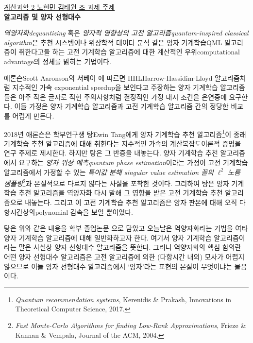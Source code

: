 \documentclass[a4paper,hidelinks]{oblivoir}
\begin{document}
\thispagestyle{empty}
\begin{center}
  \underline{계산과학 2 노현민-김태원 조 과제 주제} \\
  \textbf{ 알고리즘 및 양자 선형대수} \\ 
\end{center}
\emph{역양자화\footnotesize dequantizing} 혹은 \emph{양자적 영향상의
고전 알고리즘\footnotesize quantum-inspired classical algorithm}은 추천
시스템이나 위상학적 데이터 분석 같은 양자 기계학습{\footnotesize QML}
알고리즘이 취한다고들 하는 고전 기계학습 알고리즘에 대한 계산적인 
우위{\footnotesize computational advantage}의 정체를 밝히는 기법이다.

애론슨{\footnotesize Scott Aaronson}의 서베이 에 따르면
HHL{\footnotesize Harrow-Hassidim-Lloyd} 알고리즘처럼 지수적인 가속{\footnotesize
exponential speedup}을 보인다고 주장하는 양자 기계학습 알고리즘들은 아주
작은 글자로 적힌 주의사항처럼 결정적인 가정 내지 조건을 은연중에 요구한다.
이들 가정은 양자 기계학습 알고리즘과 고전 기계학습 알고리즘 간의 정당한
비교를 어렵게 만든다.

2018년 애론슨은 학부연구생 탕{\footnotesize Ewin Tang}에게
양자 기계학습 추천 알고리즘\footnote{\emph{Quantum recommendation systems},
  Kerenidis \& Prakash, Innovations in Theoretical Computer Science, 
2017.}이 종래 기계학습 추천 알고리즘에 대해 취한다는 지수적인 가속의
계산복잡도이론적 증명을 연구 주제로 제시한다. 하지만 탕은 그 반증을
내놓는다. 양자 기계학습 추천 알고리즘에서 요구하는 \emph{양자 위상
예측\footnotesize quantum phase estimation}이라는 가정이 고전 기계학습
알고리즘에서 가정할 수 있는 \emph{특이값 분해{\footnotesize
singular value estimation} 꼴의 $\ell^2$ 노름 샘플링}\footnote{\emph{Fast
Monte-Carlo Algorithms for finding Low-Rank Approximations}, Frieze \& Kannan
\& Vempala, Journal of the ACM, 2004.}과 본질적으로 다르지 않다는 사실을 포착한
것이다. 그리하여 탕은 양자 기계학습 추천 알고리즘을 역양자화 다시 말해 그 영향을
받은 고전 기계학습 추천 알고리즘으로 내놓는다. 그리고 이 고전 기계학습 추천
알고리즘은 양자 판본에 대해 오직 다항시간상의{\tiny polynomial} 감속을 보일
뿐이었다.

탕은 위와 같은 내용을 학부 졸업논문 으로 담았고 오늘날은 역양자화라는
기법을 여타 양자 기계학습 알고리즘에 대해 일반화하고자 한다. 여기서 양자 기계학습 
알고리즘이라는 말은 사실상 양자 선형대수 알고리즘을 뜻한다. 그러니 역양자화의
핵심 함의란 어떤 양자 선형대수 알고리즘은 고전 알고리즘에 의한 (다항시간 내의) 
모사가 어렵지 않으므로 이들 양자 선형대수 알고리즘에서 `양자'라는 표현의 본질이
무엇이냐는 물음이다. 
\end{document}
